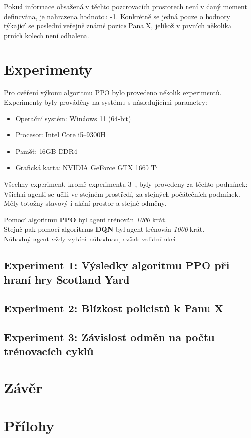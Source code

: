 Pokud informace obsažená v těchto pozorovacích prostorech není v daný moment definována, je nahrazena hodnotou -1.
Konkrétně se jedná pouze o hodnoty týkající se poslední veřejně známé pozice Pana X, jelikož v prvních několika prních kolech není odhalena.

\chapter{Experimenty}
\label{ch:experimenty}

Pro ověření výkonu algoritmu PPO bylo provedeno několik experimentů.
Experimenty byly prováděny na systému s následujícími parametry:

\begin{itemize}
  \item Operační systém: Windows 11 (64-bit)
  \item Procesor: Intel Core i5--9300H
  \item Paměť: 16GB DDR4
  \item Grafická karta: NVIDIA GeForce GTX 1660 Ti
\end{itemize}

Všechny experiment, kromě experimentu 3~, byly provedeny za těchto podmínek:\\
Všichni agenti se učili ve stejném prostředí, za stejných počátečních podmínek.
Měly totožný stavový i akční prostor a stejné odměny.

\bigskip
\noindent Pomocí algoritmu \textbf{PPO} byl agent trénován \emph{1000} krát.\\
Stejně pak pomocí algoritmus \textbf{DQN} byl agent trénován \emph{1000} krát.\\
Náhodný agent vždy vybírá náhodnou, avšak validní akci.

\section{Experiment 1: Výsledky algoritmu PPO při hraní hry Scotland Yard}
\label{sec:experiment-1}



\section{Experiment 2: Blízkost policistů k Panu X}
\label{sec:experiment-2}

\section{Experiment 3: Závislost odměn na počtu trénovacích cyklů}
\label{sec:experiment-3}


\chapter{Závěr}
\label{ch:zaver}
\chapter{Přílohy}
\label{ch:prilohy}




%
